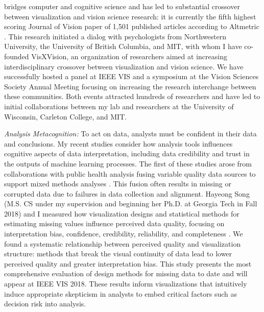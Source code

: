\documentclass[11pt]{article}
\begin{document}
bridges computer and cognitive science and has led to substantial crossover between visualization and vision science research: it is currently the fifth highest scoring Journal of Vision paper of 1,501 published articles according to Altmetric 
\cite{szafir2016Four}. This research initiated a dialog with psychologists from Northwestern University, the University of British Columbia, and MIT, with whom I have co-founded VisXVision, an organization of researchers aimed at increasing interdisciplinary crossover between visualization and vision science. We have successfully hosted a panel at IEEE VIS and a symposium at the Vision Sciences Society Annual Meeting focusing on increasing the research interchange between these communities. Both events attracted hundreds of researchers and have led to initial collaborations between my lab and researchers at the University of Wisconsin, Carleton College, and MIT. 

\emph{Analysis Metacognition: }To act on data, analysts must be confident in their data and conclusions. My recent studies 
consider how analysis tools influences cognitive aspects of data interpretation, including data credibility and trust in the outputs of machine learning processes. 
The first of these studies arose from 
collaborations with public health analysis 
fusing variable quality data sources to support mixed methods analyses \cite{pruss2018Zika}. This fusion often results in
missing or corrupted data due to failures in data collection and alignment. Hayeong Song (M.S. CS under my supervision and beginning her Ph.D. at Georgia Tech in Fall 2018) and I measured how visualization designs and statistical methods for estimating missing values influence perceived data quality, focusing on interpretation bias, confidence, credibility, reliability, and completeness \cite{song2019Wheres}. We found a systematic relationship between perceived quality and visualization structure: methods that break the visual continuity of data lead to lower perceived quality and greater interpretation bias. This study presents the most comprehensive evaluation of design methods for missing data to date and will appear at IEEE VIS 2018. These results inform visualizations that intuitively induce appropriate skepticism in analysts to embed critical factors such as decision risk into analysis.
\end{document}
